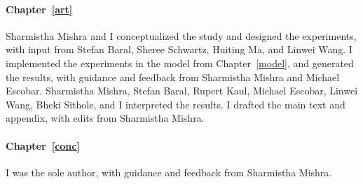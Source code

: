 \paragraph{Chapter~\ref{art}}
Sharmistha Mishra and I conceptualized the study and designed the experiments,
with input from Stefan Baral, Sheree Schwartz, Huiting Ma, and Linwei Wang.
I implemented the experiments in the model from Chapter~\ref{model}, and generated the results,
with guidance and feedback from Sharmistha Mishra and Michael Escobar.
Sharmistha Mishra, Stefan Baral, Rupert Kaul, Michael Escobar, Linwei Wang, Bheki Sithole, and I interpreted the results.
I drafted the main text and appendix, with edits from Sharmistha Mishra.
\paragraph{Chapter~\ref{conc}}
I was the sole author, with guidance and feedback from Sharmistha Mishra.

